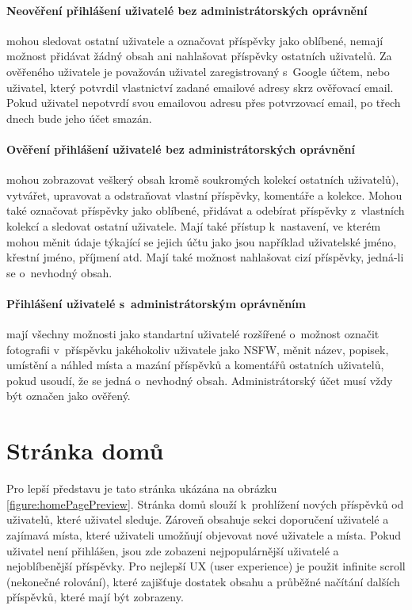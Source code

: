 \documentclass[12pt, a4paper,
  oneside,      %
]{report}
\begin{document}
\paragraph{Neověření přihlášení uživatelé bez administrátorských oprávnění} mohou sledovat ostatní uživatele a označovat příspěvky jako oblíbené, nemají možnost přidávat žádný obsah ani nahlašovat příspěvky ostatních uživatelů. Za ověřeného uživatele je považován uživatel zaregistrovaný s~Google účtem, nebo uživatel, který potvrdil vlastnictví zadané emailové adresy skrz ověřovací email. Pokud uživatel nepotvrdí svou emailovou adresu přes potvrzovací email, po třech dnech bude jeho účet smazán.
\paragraph{Ověření přihlášení uživatelé bez administrátorských oprávnění}\label{paragraph:verifiedUser} mohou zobrazovat veškerý obsah kromě soukromých kolekcí ostatních uživatelů), vytvářet, upravovat a odstraňovat vlastní příspěvky, komentáře a kolekce. Mohou také označovat příspěvky jako oblíbené, přidávat a odebírat příspěvky z~vlastních kolekcí a sledovat ostatní uživatele. Mají také přístup k~nastavení, ve kterém mohou měnit údaje týkající se jejich účtu jako jsou například uživatelské jméno, křestní jméno, příjmení atd. Mají také možnost nahlašovat cizí příspěvky, jedná-li se o~nevhodný obsah.
\paragraph{Přihlášení uživatelé s~administrátorským oprávněním}\label{paragraph:usersWithAdminPermissions} mají všechny možnosti jako standartní uživatelé rozšířené o~možnost označit fotografii v~příspěvku jakéhokoliv uživatele jako NSFW, měnit název, popisek, umístění a náhled místa a mazání příspěvků a komentářů ostatních uživatelů, pokud usoudí, že se jedná o~nevhodný obsah. Administrátorský účet musí vždy být označen jako ověřený.


\section{Stránka domů}
Pro lepší představu je tato stránka ukázána na obrázku \ref{figure:homePagePreview}. Stránka domů slouží k~prohlížení nových příspěvků od uživatelů, které uživatel sleduje. Zároveň obsahuje sekci doporučení uživatelé a zajímavá místa, které uživateli umožňují objevovat nové uživatele a místa. Pokud uživatel není přihlášen, jsou zde zobazeni nejpopulárnější uživatelé a nejoblíbenější příspěvky. Pro nejlepší UX (user experience) je použit infinite scroll (nekonečné rolování), které zajišťuje dostatek obsahu a průběžné načítání dalších příspěvků, které mají být zobrazeny.
\end{document}
